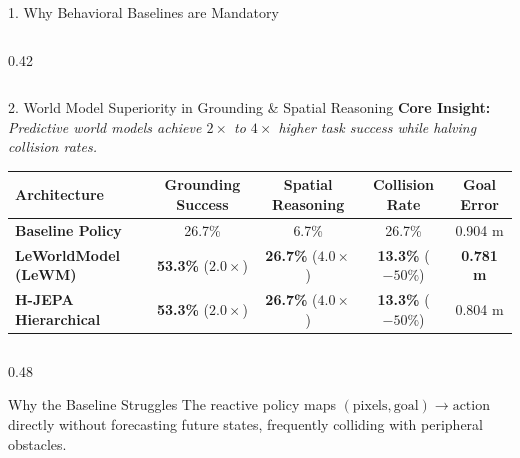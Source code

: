 \documentclass[aspectratio=169, 10pt]{beamer}
\begin{document}
\begin{frame}{1. Why Behavioral Baselines are Mandatory}
\begin{columns}[T]
\begin{column}{0.42\textwidth}
\begin{center}
      \end{center}
    \end{column}
  \end{columns}
\end{frame}

\begin{frame}{2. World Model Superiority in Grounding \& Spatial Reasoning}
  \textbf{Core Insight:} \textit{Predictive world models achieve $2\times$ to $4\times$ higher task success while halving collision rates.}

  \vspace{0.2cm}
  \begin{table}[h]
    \centering
    \small
    \begin{tabular}{lcccc}
      \toprule
      \textbf{Architecture} & \textbf{Grounding Success} & \textbf{Spatial Reasoning} & \textbf{Collision Rate} & \textbf{Goal Error} \\
      \midrule
      \textbf{Baseline Policy} & 26.7\% & 6.7\% & 26.7\% & 0.904 m \\
      \textbf{LeWorldModel (LeWM)} & \textbf{53.3\%} ($2.0\times$) & \textbf{26.7\%} ($4.0\times$) & \textbf{13.3\%} ($-50\%$) & \textbf{0.781 m} \\
      \textbf{H-JEPA Hierarchical} & \textbf{53.3\%} ($2.0\times$) & \textbf{26.7\%} ($4.0\times$) & \textbf{13.3\%} ($-50\%$) & 0.804 m \\
      \bottomrule
    \end{tabular}
  \end{table}

  \vspace{0.2cm}
  \begin{columns}[T]
    \begin{column}{0.48\textwidth}
      \begin{block}{Why the Baseline Struggles}
        \small
        The reactive policy maps $(\text{pixels}, \text{goal}) \to \text{action}$ directly without forecasting future states, frequently colliding with peripheral obstacles.
      \end{block}
    \end{column}


\end{columns}
\end{frame}
\end{document}
